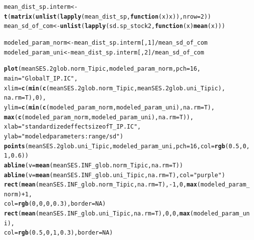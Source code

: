 \documentclass[12pt]{article}\usepackage[]{graphicx}\usepackage[]{color}
\makeatletter
\newcommand{\hlnum}[1]{\textcolor[rgb]{0.686,0.059,0.569}{#1}}%
\newcommand{\hlstr}[1]{\textcolor[rgb]{0.192,0.494,0.8}{#1}}%
\newcommand{\hlopt}[1]{\textcolor[rgb]{0,0,0}{#1}}%
\newcommand{\hlstd}[1]{\textcolor[rgb]{0.345,0.345,0.345}{#1}}%
\newcommand{\hlkwa}[1]{\textcolor[rgb]{0.161,0.373,0.58}{\textbf{#1}}}%
\newcommand{\hlkwb}[1]{\textcolor[rgb]{0.69,0.353,0.396}{#1}}%
\newcommand{\hlkwc}[1]{\textcolor[rgb]{0.333,0.667,0.333}{#1}}%
\newcommand{\hlkwd}[1]{\textcolor[rgb]{0.737,0.353,0.396}{\textbf{#1}}}%
\newenvironment{kframe}{%
 \def\at@end@of@kframe{}%
 \ifinner\ifhmode%
  \def\at@end@of@kframe{\end{minipage}}%
  \begin{minipage}{\columnwidth}%
 \fi\fi%
 \def\FrameCommand##1{\hskip\@totalleftmargin \hskip-\fboxsep
 \colorbox{shadecolor}{##1}\hskip-\fboxsep
     \hskip-\linewidth \hskip-\@totalleftmargin \hskip\columnwidth}%
 \MakeFramed {\advance\hsize-\width
   \@totalleftmargin\z@ \linewidth\hsize
   \@setminipage}}%
 {\par\unskip\endMakeFramed%
 \at@end@of@kframe}
\newenvironment{knitrout}{}{} %
\makeatother
\begin{document}
\begin{knitrout}\small
{}\color{fgcolor}\begin{kframe}
\begin{alltt}
\hlstd{mean_dist_sp.interm} \hlkwb{<-} \hlkwd{t}\hlstd{(}\hlkwd{matrix}\hlstd{(}\hlkwd{unlist}\hlstd{(}\hlkwd{lapply}\hlstd{(mean_dist_sp,} \hlkwa{function}\hlstd{(}\hlkwc{x}\hlstd{) x)),} \hlkwc{nrow} \hlstd{=} \hlnum{2}\hlstd{))}
\hlstd{mean_sd_of_com} \hlkwb{<-} \hlkwd{unlist}\hlstd{(}\hlkwd{lapply}\hlstd{(sd.sp_stock2,} \hlkwa{function}\hlstd{(}\hlkwc{x}\hlstd{)} \hlkwd{mean}\hlstd{(x)))}

\hlstd{modeled_param_norm} \hlkwb{<-} \hlstd{mean_dist_sp.interm[,} \hlnum{1}\hlstd{]} \hlopt{/} \hlstd{mean_sd_of_com}
\hlstd{modeled_param_uni} \hlkwb{<-} \hlstd{mean_dist_sp.interm[,} \hlnum{2}\hlstd{]} \hlopt{/} \hlstd{mean_sd_of_com}

\hlkwd{plot}\hlstd{(meanSES.2glob.norm_Tipic, modeled_param_norm,} \hlkwc{pch} \hlstd{=} \hlnum{16}\hlstd{,}
     \hlkwc{main} \hlstd{=} \hlstr{"Global T_IP.IC"}\hlstd{,}
     \hlkwc{xlim} \hlstd{=} \hlkwd{c}\hlstd{(}\hlkwd{min}\hlstd{(}\hlkwd{c}\hlstd{(meanSES.2glob.norm_Tipic, meanSES.2glob.uni_Tipic),}
              \hlkwc{na.rm} \hlstd{= T),} \hlnum{0}\hlstd{),}
     \hlkwc{ylim} \hlstd{=} \hlkwd{c}\hlstd{(}\hlkwd{min}\hlstd{(}\hlkwd{c}\hlstd{(modeled_param_norm, modeled_param_uni),} \hlkwc{na.rm} \hlstd{= T),}
     \hlkwd{max}\hlstd{(}\hlkwd{c}\hlstd{(modeled_param_norm, modeled_param_uni),} \hlkwc{na.rm} \hlstd{= T)),}
     \hlkwc{xlab} \hlstd{=} \hlstr{"standardized effect size of T_IP.IC"}\hlstd{,}
     \hlkwc{ylab} \hlstd{=} \hlstr{"modeled parameters: range/sd"}\hlstd{)}
\hlkwd{points}\hlstd{(meanSES.2glob.uni_Tipic, modeled_param_uni,} \hlkwc{pch} \hlstd{=} \hlnum{16}\hlstd{,} \hlkwc{col} \hlstd{=} \hlkwd{rgb}\hlstd{(}\hlnum{0.5}\hlstd{,} \hlnum{0}\hlstd{,} \hlnum{1}\hlstd{,} \hlnum{0.6}\hlstd{))}
\hlkwd{abline}\hlstd{(}\hlkwc{v} \hlstd{=} \hlkwd{mean}\hlstd{(meanSES.INF_glob.norm_Tipic,} \hlkwc{na.rm} \hlstd{= T))}
\hlkwd{abline}\hlstd{(}\hlkwc{v} \hlstd{=} \hlkwd{mean}\hlstd{(meanSES.INF_glob.uni_Tipic,} \hlkwc{na.rm} \hlstd{= T),} \hlkwc{col} \hlstd{=} \hlstr{"purple"}\hlstd{)}
\hlkwd{rect}\hlstd{(}\hlkwd{mean}\hlstd{(meanSES.INF_glob.norm_Tipic,} \hlkwc{na.rm} \hlstd{= T),} \hlopt{-}\hlnum{1}\hlstd{,} \hlnum{0}\hlstd{,} \hlkwd{max}\hlstd{(modeled_param_norm)} \hlopt{+} \hlnum{1}\hlstd{,}
     \hlkwc{col} \hlstd{=} \hlkwd{rgb}\hlstd{(}\hlnum{0}\hlstd{,} \hlnum{0}\hlstd{,} \hlnum{0}\hlstd{,} \hlnum{0.3}\hlstd{),} \hlkwc{border} \hlstd{=} \hlnum{NA}\hlstd{)}
\hlkwd{rect}\hlstd{(}\hlkwd{mean}\hlstd{(meanSES.INF_glob.uni_Tipic,} \hlkwc{na.rm} \hlstd{= T),} \hlnum{0}\hlstd{,} \hlnum{0}\hlstd{,} \hlkwd{max}\hlstd{(modeled_param_uni),}
     \hlkwc{col} \hlstd{=} \hlkwd{rgb}\hlstd{(}\hlnum{0.5}\hlstd{,} \hlnum{0}\hlstd{,} \hlnum{1}\hlstd{,} \hlnum{0.3}\hlstd{),} \hlkwc{border} \hlstd{=} \hlnum{NA}\hlstd{)}
\end{alltt}
\end{kframe}\begin{figure}


\end{figure}
\end{knitrout}
\end{document}
